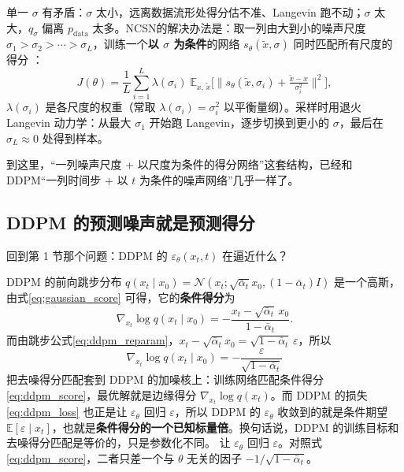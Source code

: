 单一 $\sigma$ 有矛盾：$\sigma$ 太小，远离数据流形处得分估不准、Langevin 跑不动；$\sigma$ 太大，$q_\sigma$ 偏离 $p_{\text{data}}$ 太多。NCSN的解决办法是：取一列由大到小的噪声尺度 $\sigma_1 > \sigma_2 > \cdots > \sigma_L$，训练一个\textbf{以 $\sigma$ 为条件}的网络 $s_\theta(\tilde x, \sigma)$ 同时匹配所有尺度的得分\cite{song2020generativemodelingestimatinggradients} ：
\begin{equation}
J(\theta) = \frac{1}{L}\sum_{i=1}^{L}\lambda(\sigma_i)\;
\mathbb{E}_{x,\,\tilde x}\Big[\big\| s_\theta(\tilde x, \sigma_i) + \tfrac{\tilde x - x}{\sigma_i^2}\big\|^2\Big],
\end{equation}
$\lambda(\sigma_i)$ 是各尺度的权重（常取 $\lambda(\sigma_i)=\sigma_i^2$ 以平衡量纲）。采样时用退火 Langevin 动力学：从最大 $\sigma_1$ 开始跑 Langevin，逐步切换到更小的 $\sigma$，最后在 $\sigma_L\approx 0$ 处得到样本。

到这里，“一列噪声尺度 + 以尺度为条件的得分网络”这套结构，已经和 DDPM“一列时间步 + 以 $t$ 为条件的噪声网络”几乎一样了。

\subsection{DDPM 的预测噪声就是预测得分}

回到第 1 节那个问题：DDPM 的 $\varepsilon_\theta(x_t,t)$ 在逼近什么？

DDPM 的前向跳步分布 $q(x_t\mid x_0)=\mathcal N(x_t;\sqrt{\bar\alpha_t}x_0,(1-\bar\alpha_t)I)$ 是一个高斯，由式\eqref{eq:gaussian_score} 可得，它的\textbf{条件得分}为
\begin{equation}
\nabla_{x_t}\log q(x_t\mid x_0)
= -\frac{x_t - \sqrt{\bar\alpha_t}\,x_0}{1-\bar\alpha_t}.
\end{equation}
而由跳步公式\eqref{eq:ddpm_reparam}，$x_t - \sqrt{\bar\alpha_t}x_0 = \sqrt{1-\bar\alpha_t}\,\varepsilon$，所以
\begin{equation}\label{eq:ddpm_score}
\nabla_{x_t}\log q(x_t\mid x_0) = -\frac{\varepsilon}{\sqrt{1-\bar\alpha_t}}
\end{equation}
把去噪得分匹配套到 DDPM 的加噪核上：训练网络匹配条件得分\eqref{eq:ddpm_score}，最优解就是边缘得分 $\nabla_{x_t}\log q(x_t)$。而 DDPM 的损失\eqref{eq:ddpm_loss} 也正是让 $\varepsilon_\theta$ 回归 $\varepsilon$，所以 DDPM 的 $\varepsilon_\theta$ 收敛到的就是条件期望 $\mathbb{E}[\varepsilon\mid x_t]$，也就是\textbf{条件得分的一个已知标量倍}。换句话说，DDPM 的训练目标和去噪得分匹配是等价的，只是参数化不同。
让 $\varepsilon_\theta$ 回归 $\varepsilon$。对照式\eqref{eq:ddpm_score}，二者只差一个与 $\theta$ 无关的因子 $-1/\sqrt{1-\bar\alpha_t}$。

